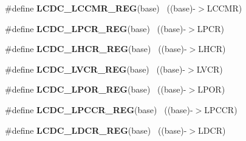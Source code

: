 \begin{DoxyCompactItemize}
\item 
\hypertarget{group___l_c_d_c___register___accessor___macros_ga7ec5679580ba18cf989dde413f502bdf}{}\#define {\bfseries L\+C\+D\+C\+\_\+\+L\+C\+C\+M\+R\+\_\+\+R\+E\+G}(base)                                      ~((base)-\/$>$L\+C\+C\+M\+R)\label{group___l_c_d_c___register___accessor___macros_ga7ec5679580ba18cf989dde413f502bdf}

\item 
\hypertarget{group___l_c_d_c___register___accessor___macros_ga7d0d79911e47a2d28ed8147f74a59df3}{}\#define {\bfseries L\+C\+D\+C\+\_\+\+L\+P\+C\+R\+\_\+\+R\+E\+G}(base)                                        ~((base)-\/$>$L\+P\+C\+R)\label{group___l_c_d_c___register___accessor___macros_ga7d0d79911e47a2d28ed8147f74a59df3}

\item 
\hypertarget{group___l_c_d_c___register___accessor___macros_ga0c25eecd22ef29549f012073cd00b7a7}{}\#define {\bfseries L\+C\+D\+C\+\_\+\+L\+H\+C\+R\+\_\+\+R\+E\+G}(base)                                        ~((base)-\/$>$L\+H\+C\+R)\label{group___l_c_d_c___register___accessor___macros_ga0c25eecd22ef29549f012073cd00b7a7}

\item 
\hypertarget{group___l_c_d_c___register___accessor___macros_ga9e9acc9df9e3ebe1f119dbe61fd54878}{}\#define {\bfseries L\+C\+D\+C\+\_\+\+L\+V\+C\+R\+\_\+\+R\+E\+G}(base)                                        ~((base)-\/$>$L\+V\+C\+R)\label{group___l_c_d_c___register___accessor___macros_ga9e9acc9df9e3ebe1f119dbe61fd54878}

\item 
\hypertarget{group___l_c_d_c___register___accessor___macros_ga5895083a276879f198ab45e4a435446a}{}\#define {\bfseries L\+C\+D\+C\+\_\+\+L\+P\+O\+R\+\_\+\+R\+E\+G}(base)                                        ~((base)-\/$>$L\+P\+O\+R)\label{group___l_c_d_c___register___accessor___macros_ga5895083a276879f198ab45e4a435446a}

\item 
\hypertarget{group___l_c_d_c___register___accessor___macros_ga865973b703eed188fbc6153726212743}{}\#define {\bfseries L\+C\+D\+C\+\_\+\+L\+P\+C\+C\+R\+\_\+\+R\+E\+G}(base)                                      ~((base)-\/$>$L\+P\+C\+C\+R)\label{group___l_c_d_c___register___accessor___macros_ga865973b703eed188fbc6153726212743}

\item 
\hypertarget{group___l_c_d_c___register___accessor___macros_ga718357f9d0543d3c7656db601ee33cda}{}\#define {\bfseries L\+C\+D\+C\+\_\+\+L\+D\+C\+R\+\_\+\+R\+E\+G}(base)                                        ~((base)-\/$>$L\+D\+C\+R)\label{group___l_c_d_c___register___accessor___macros_ga718357f9d0543d3c7656db601ee33cda}


\end{DoxyCompactItemize}
